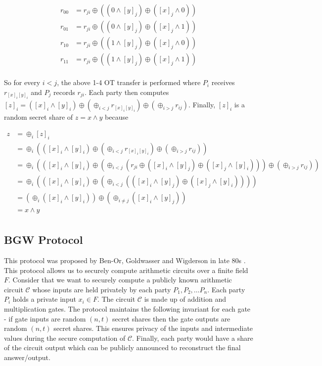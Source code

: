 \documentclass[11pt]{article}
\begin{document}
\begin{align*}
    r_{00} & = r_{ji} \oplus ((0 \land [y]_j) \oplus ([x]_j \land 0)) \\
    r_{01} & = r_{ji} \oplus ((0 \land [y]_j) \oplus ([x]_j \land 1)) \\
    r_{10} & = r_{ji} \oplus ((1 \land [y]_j) \oplus ([x]_j \land 0)) \\
    r_{11} & = r_{ji} \oplus ((1 \land [y]_j) \oplus ([x]_j \land 1)) \\
\end{align*}

So for every $i < j$, the above 1-4 OT transfer is performed where $P_i$ receives $r_{[x]_i[y]_i}$ and $P_j$ records $r_{ji}$. Each party then computes $[z]_i = ([x]_i \land [y]_i) \oplus (\oplus_{i < j} r_{[x]_i[y]_i}) \oplus (\oplus_{i > j} r_{ij})$. Finally, $[z]_i$ is a random secret share of $z = x \land y$ because

\begin{align*}
    z   & = \oplus_i [z]_i \\
        & = \oplus_i (([x]_i \land [y]_i) \oplus (\oplus_{i < j} r_{[x]_i[y]_i}) \oplus (\oplus_{i > j} r_{ij})) \\
        & = \oplus_i (([x]_i \land [y]_i) \oplus (\oplus_{i < j} (r_{ji} \oplus ([x]_i \land [y]_j) \oplus ([x]_j \land [y]_i))) \oplus (\oplus_{i > j} r_{ij})) \\
        & = \oplus_i (([x]_i \land [y]_i) \oplus (\oplus_{i < j} (([x]_i \land [y]_j) \oplus ([x]_j \land [y]_i)))) \\
        & = (\oplus_{i} ([x]_i \land [y]_i)) \oplus (\oplus_{i \ne j} ([x]_i \land [y]_j)) \\
        & = x \land y \\
\end{align*}

\subsection*{BGW Protocol}

This protocol was proposed by Ben-Or, Goldwasser and Wigderson in late 80s \cite{16, 17, 18, 19, 20}. This protocol allows us to securely compute arithmetic circuits over a finite field $F$. Consider that we want to securely compute a publicly known arithmetic circuit $\mathcal{C}$ whose inputs are held privately by each party $P_1, P_2, \dots P_n$. Each party $P_i$ holds a private input $x_i \in F$. The circuit $\mathcal{C}$ is made up of addition and multiplication gates. The protocol maintains the following invariant for each gate - if gate inputs are random $(n, t)$ secret shares then the gate outputs are random $(n, t)$ secret shares. This ensures privacy of the inputs and intermediate values during the secure computation of $\mathcal{C}$. Finally, each party would have a share of the circuit output which can be publicly announced to reconstruct the final answer/output.
\end{document}
